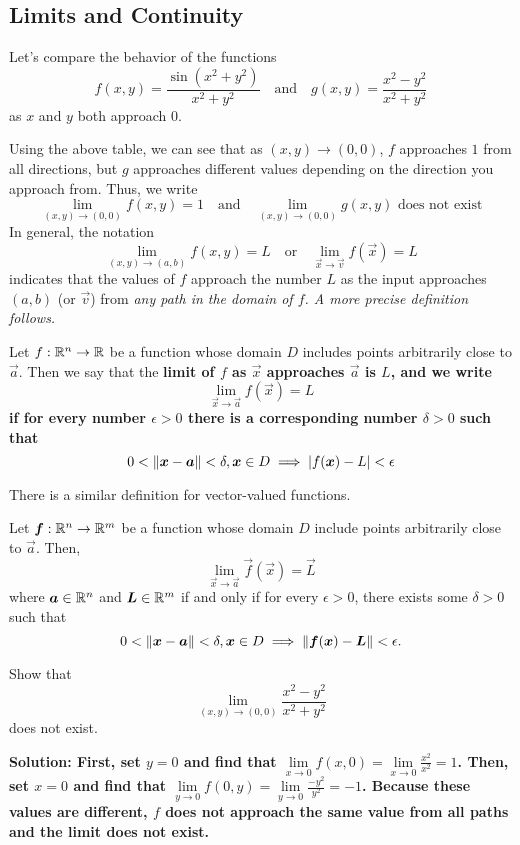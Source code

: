 \subsection{Limits and Continuity}
Let's compare the behavior of the functions 
\[ f(x,y) = \frac{\sin(x^2+y^2)}{x^2+y^2}\quad\text{and}\quad g(x,y)=\frac{x^2-y^2}{x^2+y^2}\]
as \(x\) and \(y\) both approach \(0\).
\par Using the above table, we can see that as \((x,y)\to(0,0)\), \(f\) approaches \(1\) from all directions, but \(g\) approaches different values depending on the direction you approach from. Thus, we write
\[ \lim_{(x,y)\to(0,0)}f(x,y) = 1\quad\text{and}\quad \lim_{(x,y)\to(0,0)}g(x,y) \text{ does not exist}\]
In general, the notation
\[ \lim_{(x, y)\to(a, b)}f(x,y)=L \quad\text{or}\quad \lim_{\vec x\to \vec v}f(\vec x) = L\]
indicates that the values of \(f\) approach the number \(L\) as the input approaches \((a,b)\) (or \(\vec v\)) from \it{any} path in the domain of \(f\). A more precise definition follows.
\begin{definition}
    Let \(f: \mathbb{R}^n\to \mathbb{R}\) be a function whose domain \(D\) includes points arbitrarily close to \(\vec a\). Then we say that the \bf{limit of \(f\) as \(\vec x\) approaches \(\vec a\) is \(L\)}, and we write 
    \[ \lim_{\vec x\to\vec a}f(\vec x)=L \]
    if for every number \(\epsilon > 0\) there is a corresponding number \(\delta > 0\) such that 
    \[ 0<\norm{\boldsymbol{x} - \boldsymbol{a}}<\delta, \boldsymbol{x}\in D \implies |f(\boldsymbol{x})-L|<\epsilon \]
\end{definition}
There is a similar definition for vector-valued functions.
\begin{definition}
    Let \(\boldsymbol{f}: \mathbb{R}^n\to \mathbb{R}^m\) be a function whose domain \(D\) include points arbitrarily close to \(\vec a\). Then, \[ \lim_{\vec x\to\vec a}\vec f(\vec x) = \vec L\]
    where \(\boldsymbol{a} \in \mathbb{R}^n\) and \(\boldsymbol{L} \in \mathbb{R}^m\) if and only if for every \(\epsilon > 0\), there exists some \(\delta > 0\) such that 
    \[ 0<\norm{\boldsymbol{x} - \boldsymbol{a}} < \delta, \boldsymbol{x}\in D\implies \norm{\boldsymbol{f}(\boldsymbol{x})-\boldsymbol{L}}<\epsilon. \]
\end{definition}
\begin{example}
    Show that \[\lim_{(x, y)\to(0,0)}\frac{x^2-y^2}{x^2+y^2}\] does not exist. \par\bf{Solution: }First, set \(y=0\) and find that \(\lim\limits_{x\to 0}f(x, 0) = \lim\limits_{x\to 0}\frac{x^2}{x^2}=1\). Then, set \(x=0\) and find that \(\lim\limits_{y\to 0}f(0, y) = \lim\limits_{y\to 0}\frac{-y^2}{y^2}=-1\). Because these values are different, \(f\) does not approach the same value from all paths and the limit does not exist.
\end{example}

